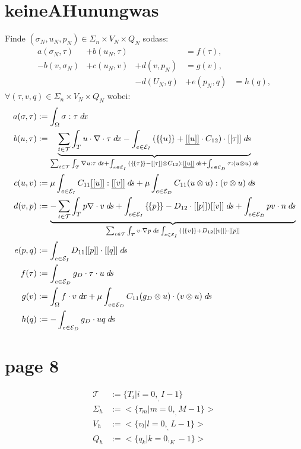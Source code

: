 \section{keineAHunungwas}
    Finde $( \sigma_N,u_N,p_N) \in \Sigma_n \times V_N \times Q_N$ sodass:
    \begin{align*}
        a(\sigma_N, \tau) &+ b(u_N,\tau) & &= f(\tau), \\
        -b(v,\sigma_N) &+ c(u_N,v) &+ d(v,p_N) &=g(v), \\
        & &- d(U_N,q) &+ e(p_N,q) &= h(q),
    \end{align*}
    $\forall(\tau,v,q) \in \Sigma_n \times V_N \times Q_N $
    wobei:
    \begin{subequations}
        \begin{align}
            a(\sigma,\tau) &:= \int_\Omega \sigma : \tau \dx \\
            b(u,\tau) &:= \underbrace{\StinT \int_T u \cdot \nabla \cdot \tau \dx - 
                                    \IeinEI{(\ldc u \rdc} + \ulusp \cdot C_{12}) \cdot \lds \tau \rds \ds }_{
                            \StinT \int_T{ \nabla u : \tau \dx } + \IeinEI{(\ldc \tau \rdc - \lds \tau \rds \otimes
                                           C_{12}):\ulusp \ds} + \IeinED{\tau : (u \otimes u ) \ds } } \\
            c(u,v) &:= \mu \IeinEI{C_{11}\ulusp : \ulvsp \ds} + \mu \IeinED{C_{11}(u \otimes u ) : ( v \otimes u ) \ds} \\
            d(v,p) &:= \underbrace{-\StinT{\int_T{p\nabla \cdot v \ds} + \IeinEI{\ldc p \rdc -
                                                                        D_{12} \cdot \lds p\rds) \lds v \rds \ds }
                              + \IeinED{pv\cdot n \ds} } }_{
                          \StinT{\int_T{v\cdot \nabla p \dx} \IeinEI{(\ldc v \rdc + D_{12} \lds v \rds ) \cdot \lds p \rds} }} \\
            e(p,q) &:= \IeinEI{D_{11} \lds p \rds \cdot \lds q \rds \ds} \\
            f(\tau) &:= \IeinED{g_D \cdot \tau \cdot u \ds} \\
            g(v) &:= \int_\Omega{f \cdot v \dx + \mu \IeinED{C_{11}(g_D \otimes u ) \cdot (v \otimes u ) \ds}}\\
            h(q) &:= -\IeinED{g_D \cdot u q \ds}
        \end{align}
    \end{subequations}
    
\section{page 8}
    \begin{definition}
        \begin{align*}
            \mathcal{T} &:= \{ T_i | i = 0,_,I-1\} \\
            \Sigma_h &:= < \{ \tau_m| m=0,_,M-1\} >  \\
            V_h &:= < \{ v_l| l=0,_,L-1\} >  \\
            Q_h&:= < \{ q_k| k=0,_K-1\} >  \\
        \end{align*}
    \end{definition}

